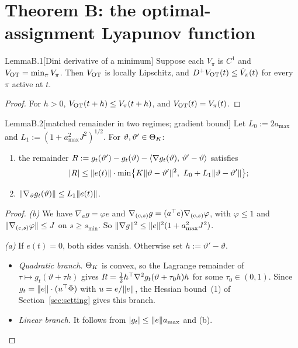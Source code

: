 \section{Theorem B: the optimal-assignment Lyapunov function}\label{sec:thmB}

\begin{thm}{Lemma}{B.1}[Dini derivative of a minimum]
Suppose each $V_\pi$ is $C^1$ and $V_{\mathrm{OT}}=\min_\pi V_\pi$. Then $V_{\mathrm{OT}}$ is locally Lipschitz, and
$D^+V_{\mathrm{OT}}(t)\le\dot V_\pi(t)$ for every $\pi$ active at $t$.
\end{thm}

\begin{proof}
For $h>0$, $V_{\mathrm{OT}}(t+h)\le V_\pi(t+h)$, and $V_{\mathrm{OT}}(t)=V_\pi(t)$.
\end{proof}

\begin{thm}{Lemma}{B.2}[matched remainder in two regimes; gradient bound]
Let $L_0:=2a_{\max}$ and $L_1:=(1+a_{\max}^2J^2)^{1/2}$. For $\vartheta,\vartheta'\in\Theta_K$:
\begin{enumerate}[label=(\alph*)]
\item the remainder $R:=g_t(\vartheta')-g_t(\vartheta)-\langle \nabla g_t(\vartheta),\, \vartheta'-\vartheta\rangle$ satisfies
  \[
    \abs{R}\le\norm{e(t)}\cdot\min\bigl\{K\norm{\vartheta-\vartheta'}^2,\ L_0+L_1\norm{\vartheta-\vartheta'}\bigr\};
  \]
\item $\lVert \nabla_\vartheta g_t(\vartheta)\rVert\le L_1\lVert e(t)\rVert$.
\end{enumerate}
\end{thm}

\begin{proof}
\textit{(b)} We have $\nabla_a g=\varphi e$ and $\nabla_{(c,s)}g=(a^\top e)\nabla_{(c,s)}\varphi$, with $\varphi\le1$ and
$\lVert \nabla_{(c,s)}\varphi\rVert\le J$ on $s\ge s_{\min}$. So $\lVert \nabla g\rVert^2\le\lVert e\rVert^2(1+a_{\max}^2J^2)$.

\textit{(a)} If $e(t)=0$, both sides vanish. Otherwise set $h:=\vartheta'-\vartheta$.
\begin{itemize}
\item \emph{Quadratic branch.} $\Theta_K$ is convex, so the Lagrange remainder of $\tau\mapsto g_t(\vartheta+\tau h)$
  gives $R=\frac12 h^\top\nabla^2g_t(\vartheta+\tau_0h)h$ for some $\tau_0\in(0,1)$. Since
  $g_t=\lVert e\rVert\cdot(u^\top\Phi)$ with $u=e/\lVert e\rVert$, the Hessian bound~(1) of Section~\ref{sec:setting} gives this
  branch.
\item \emph{Linear branch.} It follows from $\lvert g_t\rvert\le\lVert e\rVert a_{\max}$ and (b).\qedhere
\end{itemize}
\end{proof}

